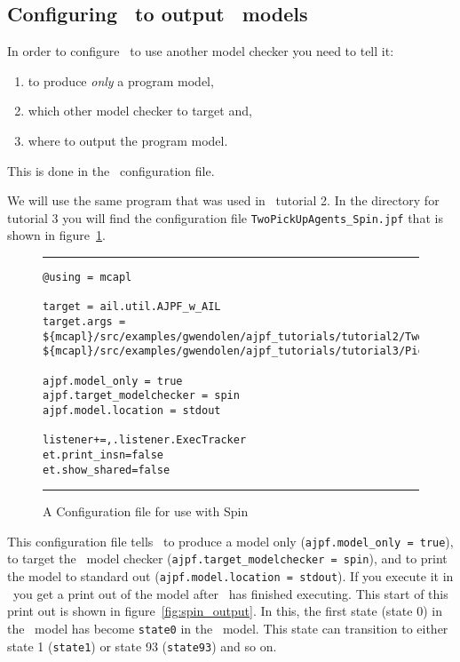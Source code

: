 \documentclass[a4]{article}
\begin{document}
\subsection{Configuring \ajpf\ to output \spin\ models}
\label{sec:configure_spin}

In order to configure \ajpf\ to use another model checker you need to tell it:
\begin{enumerate}
\item to produce \emph{only} a program model, 
\item which other model checker to target and, 
\item where to output the program model.
\end{enumerate}  This is done in the \ajpf\ configuration file.  

We will use the same program that was used in \ajpf\ tutorial 2.  In the directory for tutorial 3 you will find the configuration file \texttt{TwoPickUpAgents\_Spin.jpf} that is shown in figure~\ref{fig:spin_config}.

\begin{figure}[htb]
\noindent\rule{\textwidth}{1pt}
\begin{small}
\begin{verbatim}
@using = mcapl

target = ail.util.AJPF_w_AIL
target.args = ${mcapl}/src/examples/gwendolen/ajpf_tutorials/tutorial2/TwoPickUpAgents.ail,
${mcapl}/src/examples/gwendolen/ajpf_tutorials/tutorial3/PickUpAgent.psl,1

ajpf.model_only = true
ajpf.target_modelchecker = spin
ajpf.model.location = stdout

listener+=,.listener.ExecTracker
et.print_insn=false
et.show_shared=false
\end{verbatim}
\end{small}
\rule{\textwidth}{1pt}
\caption{A Configuration file for use with Spin}
\label{fig:spin_config}
\end{figure}

This configuration file tells \ajpf\ to produce a model only (\texttt{ajpf.model\_only = true}), to target the \spin\ model checker (\texttt{ajpf.target\_modelchecker = spin}), and to print the model to standard out (\texttt{ajpf.model.location = stdout}).  If you execute it in \ajpf\ you get a print out of the model after \ajpf\  has finished executing.  This start of this print out is shown in figure~\ref{fig:spin_output}.
In this, the first state (state 0) in the \ajpf\ model has become \texttt{state0} in the \promela\ model.  This state can transition to either state 1 (\texttt{state1}) or state 93 (\texttt{state93}) and so on.
\end{document}
